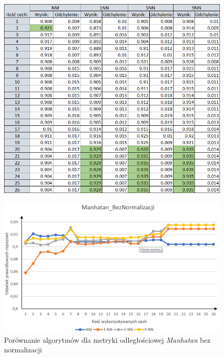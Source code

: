 \documentclass[12pt]{article}
\begin{document}
\begin{figure}[H]
	\centering
		\includegraphics[scale=0.8]{images/algorithms/manhatan_beznorm_tab.png}
	
\end{figure}
\begin{figure}[H]
	\centering
		\includegraphics[scale=0.66]{images/algorithms/manhatan_beznorm.png}
	\caption{Porównanie algorytmów dla metryki odległościowej \textit{Manhatan} bez normalizacji}
\end{figure}


\end{document}
